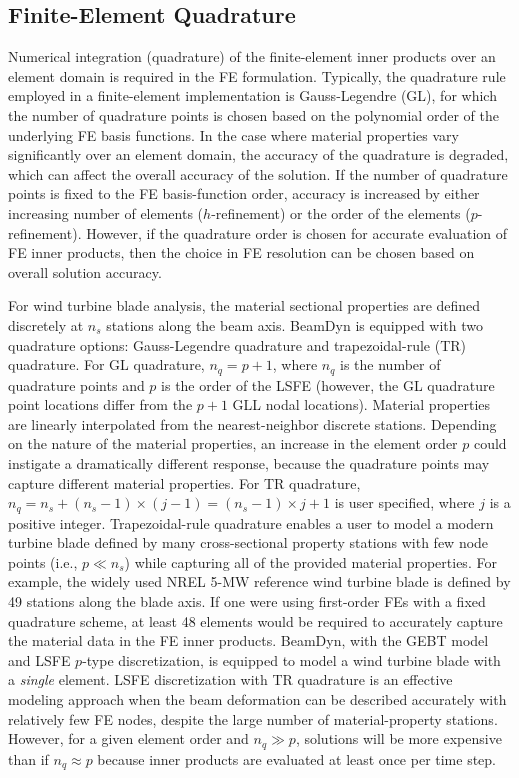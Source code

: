 \documentclass{aiaa-tc}
\begin{document}
\subsection{Finite-Element Quadrature}
\label{sec:quad}

Numerical integration (quadrature) of the finite-element inner products over an element domain is required in the FE formulation.   
Typically, the quadrature rule employed in a finite-element implementation is Gauss-Legendre (GL), for which the number of quadrature points is chosen based on the polynomial order of the underlying FE basis functions.  
In the case where material properties vary significantly over an element domain, the accuracy of the quadrature is degraded, which can affect the overall accuracy of the solution.   If the number of quadrature points is fixed to the FE basis-function order, accuracy is increased by either increasing number of elements ($h$-refinement) or the order of the elements ($p$-refinement).  However, if the quadrature order is chosen for accurate evaluation of FE inner products, then the choice in FE resolution can be chosen based on overall solution accuracy.

For wind turbine blade analysis, the material sectional properties are defined discretely at $n_s$ stations along the beam axis.
BeamDyn is equipped with two quadrature options: Gauss-Legendre quadrature and trapezoidal-rule (TR) quadrature.  
For GL quadrature, $n_q= p + 1$, where $n_q$ is the number of quadrature points and $p$ is the order of the LSFE  (however, the GL quadrature point locations differ from the $p+1$ GLL nodal locations).  Material properties are linearly interpolated from the nearest-neighbor discrete stations. 
Depending on the nature of the material properties, an increase in the element order $p$ could instigate a dramatically different response, because the quadrature points may capture different material properties.
For TR quadrature, $n_q = n_s + (n_s-1) \times (j-1)
= ( n_s - 1 ) \times j + 1$ is user specified, where $j$ is a positive integer. 
Trapezoidal-rule quadrature enables a user to model a modern turbine blade defined by many cross-sectional property stations with few node points (i.e., $p \ll n_s$) while capturing all of the provided material properties.
For example, 
the widely used NREL 5-MW reference wind turbine\cite{Jonkman-etal:2009} blade is defined by 49 stations along the blade axis.   If one were using first-order FEs with a fixed quadrature scheme, at least 48 elements would be required to accurately capture the material data in the FE inner products.
BeamDyn, with the GEBT model and LSFE $p$-type discretization, is equipped to model a wind turbine blade with a \textit{single} element.  
LSFE discretization with TR quadrature 
is an effective modeling approach when the beam deformation can be described accurately with relatively few FE nodes, despite the large number of material-property stations.    However, for a given element order and $n_q \gg p$, solutions will be more expensive than if $n_q \approx p$ because inner products are evaluated at least once per time step. 
\end{document}
